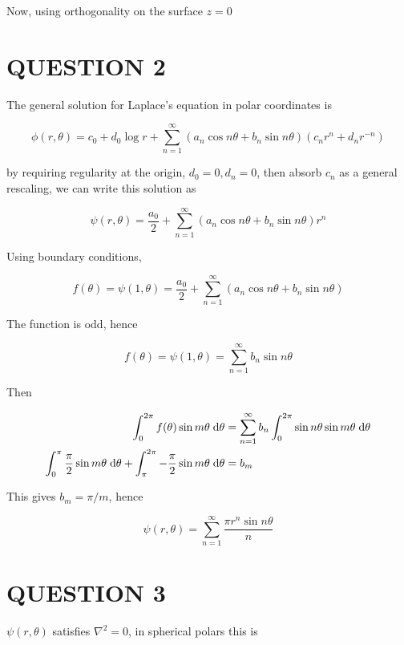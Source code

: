 \documentclass[a4paper]{article}
\begin{document}
Now, using orthogonality on the surface $ z = 0 $

%





\section{QUESTION 2}

The general solution for Laplace's equation in polar coordinates is

\[ \phi(r,\theta) = c_{0} + d_{0} \log r + \sum_{n=1}^{\infty}  (a_{n} \cos n \theta  + b_{n} \sin n \theta )(c_{n}r^{n}  + d_{n}r^{-n} )  \]

by requiring regularity at the origin, $ d_{0}=0,d_{n} = 0 $, then absorb $ c_{n} $ as a general rescaling, we can write this solution as

\[ \psi(r,\theta)  = \frac{a_{0}}{2} + \sum_{n=1}^{\infty} (a_{n}  \cos n \theta + b_{n} \sin n \theta ) r^{n}  \]

Using boundary conditions,

\[ f(\theta) = \psi(1,\theta)  = \frac{a_{0}}{2} + \sum_{n=1}^{\infty} (a_{n}  \cos n \theta + b_{n} \sin n \theta ) \]


The function is odd, hence 

\[ f(\theta) = \psi(1,\theta)  = \sum_{n=1}^{\infty} b_{n} \sin n \theta \]

Then

\begin{align*}
\int_{0}^{2\pi} f(\theta) \sin m \theta \; \mathrm{d} \theta  & = \sum_{n=1}^{\infty} b_{n}  \int_{0}^{2\pi} \sin n \theta   \sin m \theta  \; \mathrm{d} \theta \\
\int_{0}^{\pi} \frac{\pi}{2}  \sin m \theta  \; \mathrm{d} \theta + \int_{\pi}^{2\pi} - \frac{\pi}{2}  \sin m \theta \; \mathrm{d} \theta & = b_{m}
\end{align*}

This gives $ b_{m} = \pi / m $, hence

\[ \psi(r,\theta)  =  \sum_{n=1}^{\infty}  \frac{\pi r^{n} \sin n \theta }{n}  \]










\section{QUESTION 3}


$ \psi(r,\theta) $ satisfies $ \nabla^{2} = 0 $, in spherical polars this is
\end{document}
